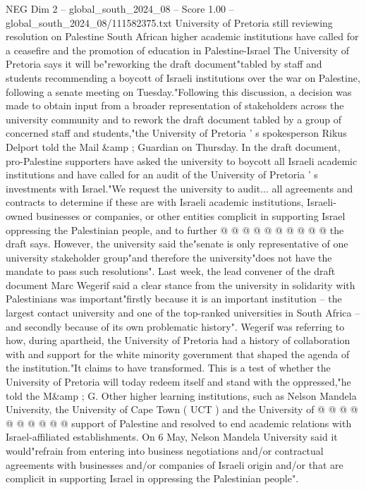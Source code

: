 \begin{textsample}{NEG Dim 2 – global\_south\_2024\_08 – Score 1.00 – global\_south\_2024\_08/111582375.txt}  \label{ex:f2_neg_427}
University of Pretoria still reviewing resolution on Palestine South African higher academic institutions have called for a ceasefire and the promotion of education in Palestine-Israel The University of Pretoria says it will be"reworking the draft document"tabled by staff and students recommending a boycott of Israeli institutions over the war on Palestine, following a senate meeting on Tuesday."Following this discussion, a decision was made to obtain input from a broader representation of stakeholders across the university community and to rework the draft document tabled by a group of concerned staff and students,"the University of Pretoria ' s spokesperson Rikus Delport told the Mail \&amp ; Guardian on Thursday.
In the draft document, pro-Palestine supporters have asked the university to boycott all Israeli academic institutions and have called for an audit of the University of Pretoria ' s investments with Israel."We request the university to audit... all agreements and contracts to determine if these are with Israeli academic institutions, Israeli-owned businesses or companies, or other entities complicit in supporting Israel oppressing the Palestinian people, and to further @ @ @ @ @ @ @ @ @ @ the draft says.
However, the university said the"senate is only representative of one university stakeholder group"and therefore the university"does not have the mandate to pass such resolutions".
Last week, the lead convener of the draft document Marc Wegerif said a clear stance from the university in solidarity with Palestinians was important"firstly because it is an important institution -- the largest contact university and one of the top-ranked universities in South Africa -- and secondly because of its own problematic history".
Wegerif was referring to how, during apartheid, the University of Pretoria had a history of collaboration with and support for the white minority government that shaped the agenda of the institution."It claims to have transformed.
This is a test of whether the University of Pretoria will today redeem itself and stand with the oppressed,"he told the M\&amp ; G.
Other higher learning institutions, such as Nelson Mandela University, the University of Cape Town ( UCT ) and the University of @ @ @ @ @ @ @ @ @ @ support of Palestine and resolved to end academic relations with Israel-affiliated establishments.
On 6 May, Nelson Mandela University said it would"refrain from entering into business negotiations and/or contractual agreements with businesses and/or companies of Israeli origin and/or that are complicit in supporting Israel in oppressing the Palestinian people".

\end{textsample}
